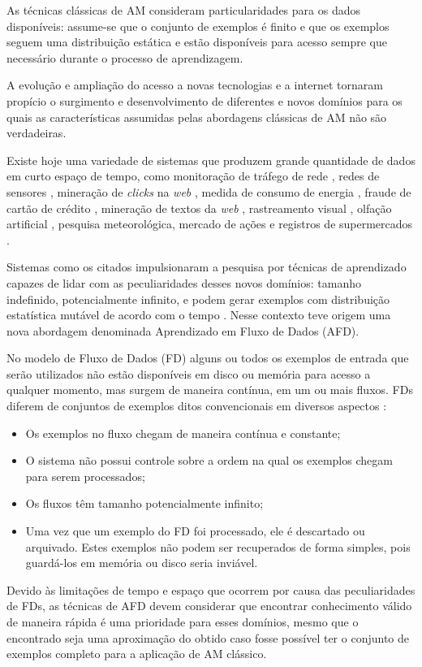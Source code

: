 As técnicas clássicas de AM consideram particularidades para os dados disponíveis: assume-se que o conjunto de exemplos é finito e que os exemplos seguem uma distribuição estática e estão disponíveis para acesso sempre que necessário durante o processo de aprendizagem. 

A evolução e ampliação do acesso a novas tecnologias e a internet tornaram propício o surgimento e desenvolvimento de diferentes e novos domínios para os quais as características assumidas pelas abordagens clássicas de AM não são verdadeiras.

Existe hoje uma variedade de sistemas que produzem grande quantidade de dados em curto espaço de tempo, como monitoração de tráfego de rede \cite{Aggarwal2008,Yu2009,Zhang2012,Breve2013}, redes de sensores \cite{gama2007,Pan2007,Zhang2012,Bouchachia2014}, mineração de \emph{clicks} na \emph{web} \cite{Marin2013}, medida de consumo de energia \cite{DeSilva2011,Zhang2012}, fraude de cartão de crédito \cite{wu2012}, mineração de textos da \emph{web} \cite{FdezRiverola2007,Cheng2011,Kmieciak2011,Nahar2014}, rastreamento visual \cite{Liu2014}, olfação artificial \cite{DeVito2012}, pesquisa meteorológica, mercado de ações e registros de supermercados \cite{Yogita2013}.

Sistemas como os citados impulsionaram a pesquisa por técnicas de aprendizado capazes de lidar com as peculiaridades desses novos domínios: tamanho indefinido, potencialmente infinito, e podem gerar exemplos com distribuição estatística mutável de acordo com o tempo \cite{Gama2010}. Nesse contexto teve origem uma nova abordagem denominada Aprendizado em Fluxo de Dados (AFD).

No modelo de Fluxo de Dados (FD) alguns ou todos os exemplos de entrada que serão utilizados não estão disponíveis em disco ou memória para acesso a qualquer momento, mas surgem de maneira contínua, em um ou mais fluxos. FDs diferem de conjuntos de exemplos ditos convencionais em diversos aspectos \cite{Babcock2002}:

\begin{itemize}
\item Os exemplos no fluxo chegam de maneira contínua e constante;
\item O sistema não possui controle sobre a ordem na qual os exemplos chegam para serem processados;
\item Os fluxos têm tamanho potencialmente infinito;
\item Uma vez que um exemplo do FD foi processado, ele é descartado ou arquivado. Estes exemplos não podem ser recuperados de forma simples, pois guardá-los em memória ou disco seria inviável.
\end{itemize}

Devido às limitações de tempo e espaço que ocorrem por causa das peculiaridades de FDs, as técnicas de AFD devem considerar que encontrar conhecimento válido de maneira rápida é uma prioridade para esses domínios, mesmo que o encontrado seja uma aproximação do obtido caso fosse possível ter o conjunto de exemplos completo para a aplicação de AM clássico.